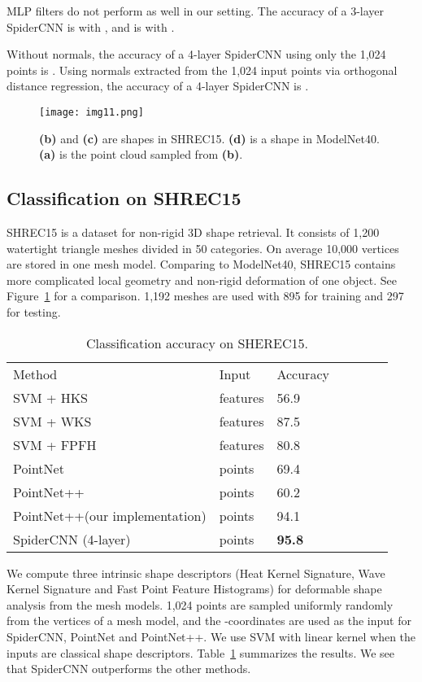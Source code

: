 \documentclass[runningheads]{llncs}
\begin{document}
MLP filters do not perform as well in our setting. 
The accuracy of a 3-layer SpiderCNN is  with , and is  with .

Without normals, the accuracy of a 4-layer SpiderCNN using only the 1,024 points is . Using normals extracted from the 1,024 input points via orthogonal distance regression, the accuracy of a 4-layer SpiderCNN is .

\begin{figure}
\centering
\texttt{[image: img11.png]} 
\caption{
{\bf (b)} and { \bf(c) } are shapes in SHREC15. {\bf (d) } is a shape in ModelNet40.
{\bf (a)} is the point cloud sampled from {\bf (b)}.
}
\label{fig:shrec15}
\end{figure}


\subsection{Classification on SHREC15}

SHREC15 is a dataset for non-rigid 3D shape retrieval. It consists of 1,200 watertight triangle meshes divided in 50 categories. On average 10,000 vertices are stored in one mesh model. Comparing to ModelNet40, SHREC15 contains more complicated local geometry and non-rigid deformation of one object. See Figure~\ref{fig:shrec15} for a comparison. 
1,192 meshes are used with 895 for training and 297 for testing. 
\setlength{\tabcolsep}{4pt}
\begin{table}
\begin{center}
\caption{Classification accuracy on SHEREC15.}
\label{table:shrec15}
\begin{tabular}{lllllll}
\hline\noalign{\smallskip}
Method & Input & Accuracy
\\
\noalign{\smallskip}
\hline
\noalign{\smallskip}
SVM + HKS & features & 56.9
\\
SVM + WKS& features & 87.5
\\
SVM + FPFH & features & 80.8
\\
PointNet & points & 69.4
\\
PointNet++ \cite{qi2017pointnet++} & points & 60.2
\\
PointNet++(our implementation) & points & 94.1
\\
SpiderCNN (4-layer) & points  & {\bf 95.8}
\\
\hline
\end{tabular}
\end{center}
\end{table}
\setlength{\tabcolsep}{1.4pt}
We compute three intrinsic shape descriptors (Heat Kernel Signature, Wave Kernel Signature and Fast Point Feature Histograms) for deformable shape analysis from the mesh models. 1,024 points are sampled uniformly randomly from the vertices of a mesh model, and the -coordinates are  used as the input for SpiderCNN, PointNet and PointNet++. 
We use SVM with linear kernel when the inputs are classical shape descriptors. Table~\ref{table:shrec15} summarizes the results. We see that SpiderCNN outperforms the other methods.
\end{document}
